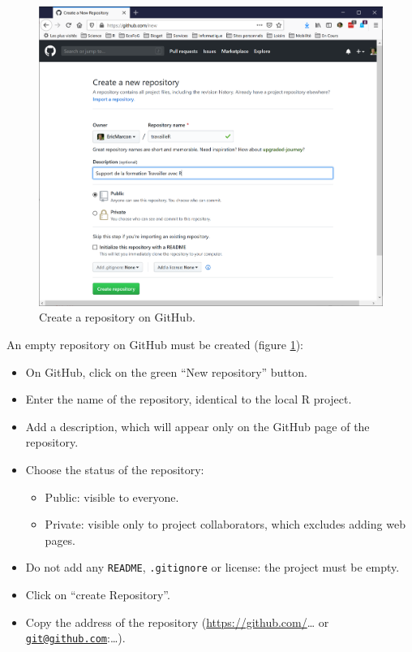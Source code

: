 \documentclass[
  12pt,
  american,
  a4paper,
  extrafontsizes,onecolumn,openright
  ]{memoir}
\providecommand{\tightlist}{%
  \setlength{\itemsep}{0pt}\setlength{\parskip}{0pt}}
\begin{document}
\scriptsize

\begin{figure}

{\centering \includegraphics[width=0.8\linewidth]{images/CreateRepo} 

}

\caption{Create a repository on GitHub.}\label{fig:CreateRepo}
\end{figure}

\normalsize

An empty repository on GitHub must be created (figure \ref{fig:CreateRepo}):

\begin{itemize}
\tightlist
\item
  On GitHub, click on the green \enquote{New repository} button.
\item
  Enter the name of the repository, identical to the local R project.
\item
  Add a description, which will appear only on the GitHub page of the repository.
\item
  Choose the status of the repository:

  \begin{itemize}
  \tightlist
  \item
    Public: visible to everyone.
  \item
    Private: visible only to project collaborators, which excludes adding web pages.
  \end{itemize}
\item
  Do not add any \texttt{README}, \texttt{.gitignore} or license: the project must be empty.
\item
  Click on \enquote{create Repository}.
\item
  Copy the address of the repository (\url{https://github.com/}\ldots{} or \href{mailto:git@github.com}{\nolinkurl{git@github.com}}:\ldots).
\end{itemize}
\end{document}
